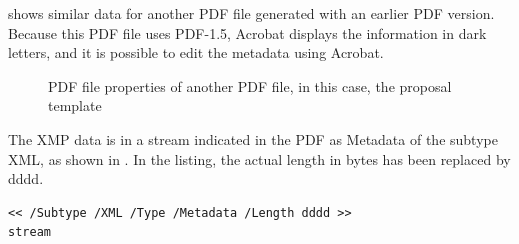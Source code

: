  shows similar data for another PDF file generated with an earlier PDF version. Because this PDF file uses PDF-1.5, Acrobat displays the information in dark letters, and it is possible to edit the metadata using Acrobat.
\begin{figure}[!ht]
  \begin{center}
  \end{center}
  \caption{PDF file properties of another PDF file, in this case, the proposal template}
  \label{fig:fileProperties2}
\end{figure}
\FloatBarrier

The XMP data is in a stream indicated in the PDF as Metadata of the subtype XML, as shown in . In the listing, the actual length in bytes has been replaced by dddd.
\begin{lstlisting}[caption={PDF stream where the XMP is found}, label=lst:pdfXMPStream]
<< /Subtype /XML /Type /Metadata /Length dddd >>
stream
\end{lstlisting}

